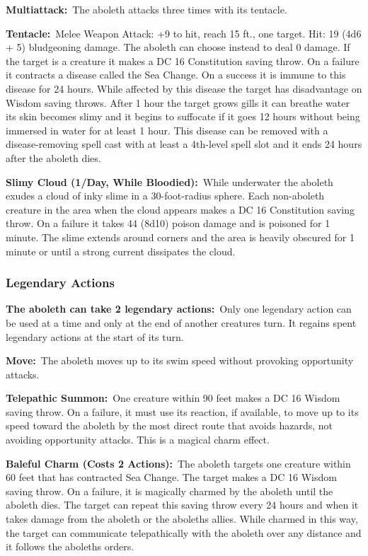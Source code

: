 \documentclass[10pt,twocolumn]{article}
\let\oldtextbf\textbf
\renewcommand{\textbf}[1]{\oldtextbf{{#1}}}
\begin{document}
\textbf{Multiattack:}~The aboleth attacks three times with its tentacle.

\textbf{Tentacle:}~Melee Weapon Attack: +9 to hit, reach 15 ft., one
target. Hit: 19 (4d6 + 5) bludgeoning damage. The aboleth can choose
instead to deal 0 damage. If the target is a creature it makes a DC 16
Constitution saving throw. On a failure it contracts a disease called
the Sea Change. On a success it is immune to this disease for 24 hours.
While affected by this disease the target has disadvantage on Wisdom
saving throws. After 1 hour the target grows gills it can breathe water
its skin becomes slimy and it begins to suffocate if it goes 12 hours
without being immersed in water for at least 1 hour. This disease can be
removed with a disease-removing spell cast with at least a 4th-level
spell slot and it ends 24 hours after the aboleth dies.

\textbf{Slimy Cloud (1/Day, While Bloodied):}~While underwater the
aboleth exudes a cloud of inky slime in a 30-foot-radius sphere. Each
non-aboleth creature in the area when the cloud appears makes a DC 16
Constitution saving throw. On a failure it takes 44 (8d10) poison damage
and is poisoned for 1 minute. The slime extends around corners and the
area is heavily obscured for 1 minute or until a strong current
dissipates the cloud.

\subsubsection{Legendary Actions}\label{legendary-actions}

\textbf{The aboleth can take 2 legendary actions:}~Only one legendary
action can be used at a time and only at the end of another creatures
turn. It regains spent legendary actions at the start of its turn.

\textbf{Move:}~The aboleth moves up to its swim speed without provoking
opportunity attacks.

\textbf{Telepathic Summon:}~One creature within 90 feet makes a DC 16
Wisdom saving throw. On a failure, it must use its reaction, if
available, to move up to its speed toward the aboleth by the most direct
route that avoids hazards, not avoiding opportunity attacks. This is a
magical charm effect.

\textbf{Baleful Charm (Costs 2 Actions):}~The aboleth targets one
creature within 60 feet that has contracted Sea Change. The target makes
a DC 16 Wisdom saving throw. On a failure, it is magically charmed by
the aboleth until the aboleth dies. The target can repeat this saving
throw every 24 hours and when it takes damage from the aboleth or the
aboleths allies. While charmed in this way, the target can communicate
telepathically with the aboleth over any distance and it follows the
aboleths orders.
\end{document}

